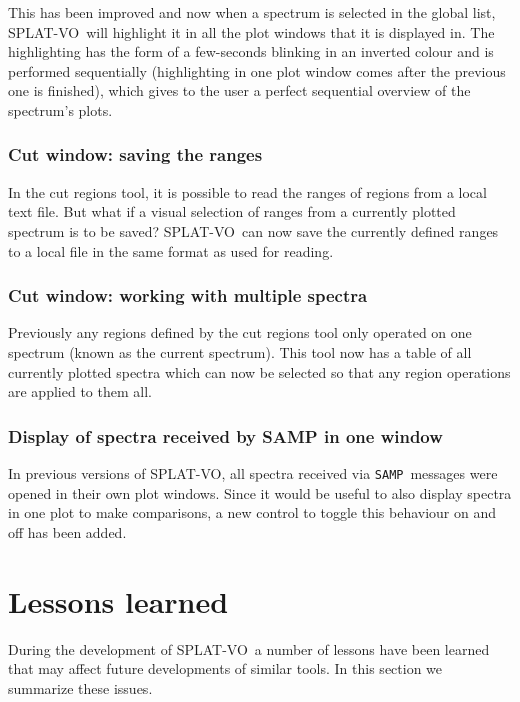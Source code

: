 \documentclass[final,authoryear,5p,times,twocolumn]{elsarticle}
\newcommand{\samp}{\texttt{SAMP}}
\newcommand{\splatvo}{{\textsf{\small{SPLAT-VO}}}}
\begin{document}
This has been improved and now when a spectrum is selected in the global
list, \splatvo\ will highlight it in all the plot windows that it is displayed in.
The highlighting has the form of a few-seconds blinking in an inverted colour
and is performed sequentially (highlighting in one plot window comes after the
previous one is finished), which gives to the user a perfect sequential overview
of the spectrum's plots.

\subsubsection{Cut window: saving the ranges}

In the cut regions tool, it is possible to read the ranges of regions from a
local text file. But what if a visual selection of ranges from a currently
plotted spectrum is to be saved?  \splatvo\ can now save the currently
defined ranges to a local file in the same format as used for reading.

\subsubsection{Cut window: working with multiple spectra}

Previously any regions defined by the cut regions tool only operated on one
spectrum (known as the current spectrum). This tool now has a table of all
currently plotted spectra which can now be selected so that any region
operations are applied to them all.

\subsubsection{Display of spectra received by SAMP in one window}

In previous versions of \splatvo, all spectra received via \samp\ messages
were opened in their own plot windows. Since it would be useful
to also display spectra in one plot to make comparisons, a new control to
toggle this behaviour on and off has been added.

\section{Lessons learned}

During the development of \splatvo\ a number of lessons have been
learned that may affect future developments of similar tools. In this
section we summarize these issues.
\end{document}

